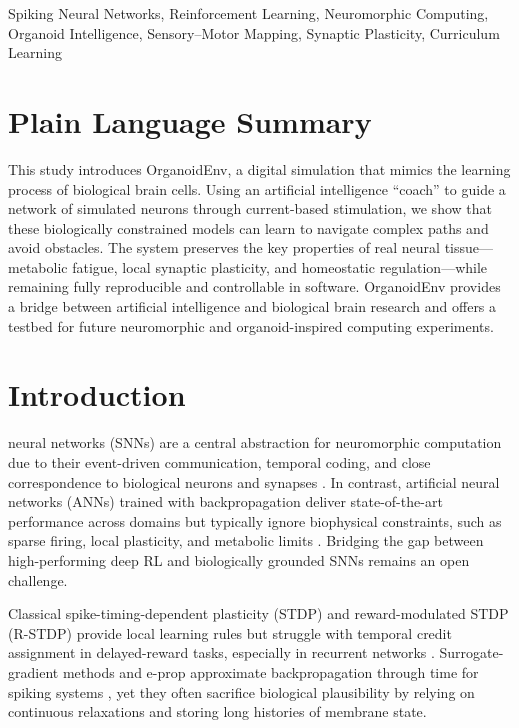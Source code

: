 \documentclass[journal,twocolumn]{IEEEtran}
\begin{document}
\begin{IEEEkeywords}
Spiking Neural Networks, Reinforcement Learning, Neuromorphic
Computing, Organoid Intelligence, Sensory--Motor Mapping, Synaptic
Plasticity, Curriculum Learning
\end{IEEEkeywords}

\section*{Plain Language Summary}

This study introduces OrganoidEnv, a digital simulation that mimics
the learning process of biological brain cells.  Using an artificial
intelligence ``coach'' to guide a network of simulated neurons through
current-based stimulation, we show that these biologically constrained
models can learn to navigate complex paths and avoid obstacles.  The
system preserves the key properties of real neural tissue---metabolic
fatigue, local synaptic plasticity, and homeostatic regulation---while
remaining fully reproducible and controllable in software.  OrganoidEnv
provides a bridge between artificial intelligence and biological brain
research and offers a testbed for future neuromorphic and
organoid-inspired computing experiments.

\section{Introduction}

 neural networks (SNNs) are a central
abstraction for neuromorphic computation due to their event-driven
communication, temporal coding, and close correspondence to biological
neurons and synapses \cite{Izhikevich2003simple,NeuromorphicReview2019}.
In contrast, artificial neural networks (ANNs) trained with
backpropagation deliver state-of-the-art performance across domains
but typically ignore biophysical constraints, such as sparse firing,
local plasticity, and metabolic limits \cite{Mnih2015human}.
Bridging the gap between high-performing deep RL and biologically
grounded SNNs remains an open challenge.

Classical spike-timing-dependent plasticity (STDP) and
reward-modulated STDP (R-STDP) provide local learning rules but
struggle with temporal credit assignment in delayed-reward tasks,
especially in recurrent networks
\cite{Florian2007rstdp,FarriesFairhall2007}.  Surrogate-gradient
methods and e-prop approximate backpropagation through time for
spiking systems \cite{Bellec2018l2l,DirectTrainingSNN2024}, yet they
often sacrifice biological plausibility by relying on continuous
relaxations and storing long histories of membrane state.
\end{document}
